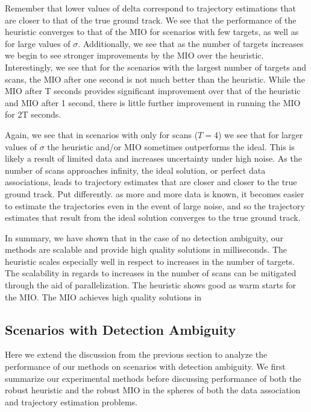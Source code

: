 Remember that lower values of delta correspond to trajectory estimations that are closer to that of the true ground track. We see that the performance of the heuristic converges to that of the MIO for scenarios with few targets, as well as for large values of $\sigma$. Additionally, we see that as the number of targets increases we begin to see stronger improvements by the MIO over the heuristic. Interestingly, we see that for the scenarios with the largest number of targets and scans, the MIO after one second is not much better than the heuristic. While the MIO after T seconds provides significant improvement over that of the heuristic and MIO after 1 second, there is little further improvement in running the MIO for 2T seconds. 

Again, we see that in scenarios with only for scans ($T=4$) we see that for larger values of $\sigma$ the heuristic and/or MIO sometimes outperforms the ideal. This is likely a result of limited data and increases uncertainty under high noise. As the number of scans approaches infinity, the ideal solution, or perfect data associations, leads to trajectory estimates that are closer and closer to the true ground track. Put differently. as more and more data is known, it becomes easier to estimate the trajectories even in the event of large noise, and so the trajectory estimates that result from the ideal solution converges to the true ground track. 

In summary, we have shown that in the case of no detection ambiguity, our methods are scalable and provide high quality solutions in milliseconds. The heuristic scales especially well in respect to increases in the number of targets. The scalability in regards to increases in the number of scans can be mitigated through the aid of parallelization. The heuristic shows good  as warm starts for the MIO. The MIO achieves high quality solutions in 

\subsection{Scenarios with Detection Ambiguity}
Here we extend the discussion from the previous section to analyze the performance of our methods on scenarios with detection ambiguity. We first summarize our experimental methods before discussing performance of both the robust heuristic and the robust MIO in the spheres of both the data association and trajectory estimation problems.

